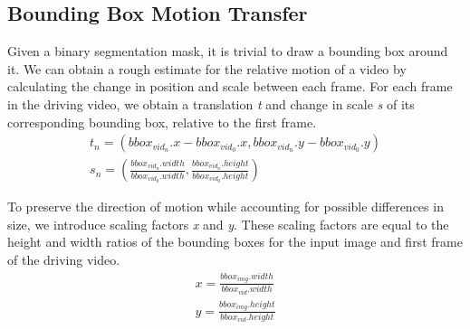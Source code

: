 \subsection{Bounding Box Motion Transfer}


Given a binary segmentation mask, it is trivial to draw a bounding box around it. We can obtain a rough estimate for the relative motion of a video by calculating the change in position and scale between each frame.
For each frame in the driving video, we obtain a translation \textit{t} and change in scale \textit{s} of its corresponding bounding box, relative to the first frame.
\begin{equation}
    \begin{gathered}
        t_{n} = (bbox_{vid_n}.x-bbox_{vid_0}.x, bbox_{vid_n}.y-bbox_{vid_0}.y) \\
        s_{n} = (\frac{bbox_{vid_n}.width}{bbox_{vid_0}.width},\frac{bbox_{vid_n}.height}{bbox_{vid_0}.height})
    \end{gathered}
    \label{eq:transformation}
\end{equation}


To preserve the direction of motion while accounting for possible differences in size, we introduce scaling factors \textit{x} and \textit{y}.
These scaling factors are equal to the height and width ratios of the bounding boxes for the input image and first frame of the driving video.
\begin{equation}
    \begin{gathered}
        x = \frac{bbox_{img}.width}{bbox_{vid}.width} \\ y = \frac{bbox_{img}.height}{bbox_{vid}.height}
    \end{gathered}
    \label{eq:scaling}
\end{equation}

